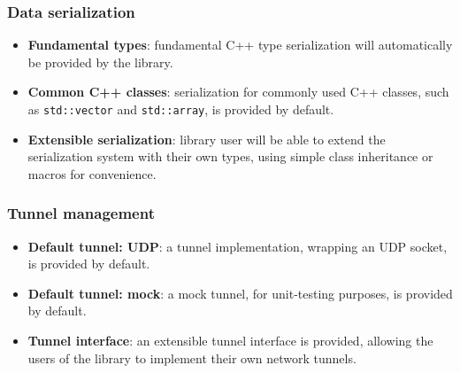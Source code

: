 \documentclass[12pt]{report}
\renewcommand\emph{\textbf}
\begin{document}

                 \subsubsection{Data serialization}
                    \begin{itemize}
                        \item \emph{Fundamental types}: fundamental C++ type serialization will automatically be provided by the library.
                        \item \emph{Common C++ classes}: serialization for commonly used C++ classes, such as \texttt{std::vector} and \texttt{std::array}, is provided by default.
                        \item \emph{Extensible serialization}: library user will be able to extend the serialization system with their own types, using simple class inheritance or macros for convenience.
                    \end{itemize}


                  \subsubsection{Tunnel management}
                    \begin{itemize}
                        \item \emph{Default tunnel: UDP}: a tunnel implementation, wrapping an UDP socket, is provided by default.
                        \item \emph{Default tunnel: mock}: a mock tunnel, for unit-testing purposes, is provided by default.
                        \item \emph{Tunnel interface}: an extensible tunnel interface is provided, allowing the users of the library to implement their own network tunnels.
                    \end{itemize}
\end{document}
